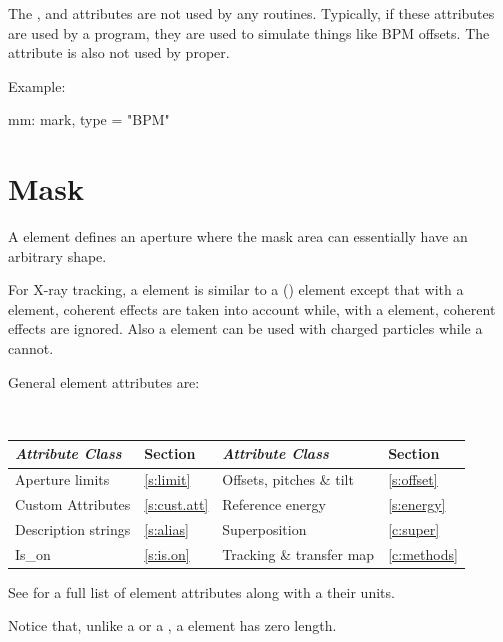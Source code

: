 {
The ,  and  attributes are not used
by any \bmad routines. Typically, if these attributes are used by a
program, they are used to simulate things like BPM offsets. The
 attribute is also not used by \bmad proper. 

Example:
\begin{example}
  mm: mark, type = "BPM"
\end{example}

\newpage

\section{Mask}
\label{s:mask}

A  element defines an aperture where the mask area can
essentially have an arbitrary shape. 

For X-ray tracking, a  element is similar to a
 () element except that with
a  element, coherent effects are taken into
account while, with a  element, coherent effects are ignored.
Also a  element can be used with charged particles while a
 cannot.

General  element attributes are:
\begin{center}
\tt 
\begin{tabular}{llll} \toprule
  {\sl Attribute Class}      & Section           & {\sl Attribute Class}      & Section         \\ \midrule
  Aperture limits            & \ref{s:limit}     & Offsets, pitches \& tilt   & \ref{s:offset}  \\
  Custom Attributes          & \ref{s:cust.att}  & Reference energy           & \ref{s:energy}  \\
  Description strings        & \ref{s:alias}     & Superposition              & \ref{c:super}   \\
  Is_on                      & \ref{s:is.on}     & Tracking \& transfer map   & \ref{c:methods} \\
  \bottomrule
\end{tabular}
\end{center}
\toffset
See  for a full list of element attributes along with a their units.

Notice that, unlike a  or a , a  element has zero length.

}
